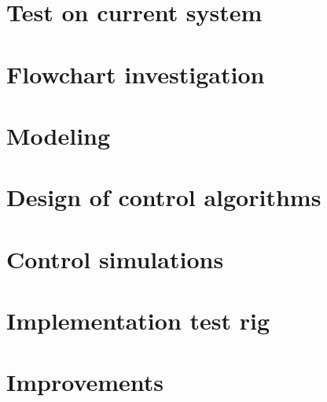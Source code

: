 
\section{Test on current system}


\section{Flowchart investigation}

\section{Modeling}

\section{Design of control algorithms}

\section{Control simulations}

\section{Implementation test rig}

\section{Improvements}

